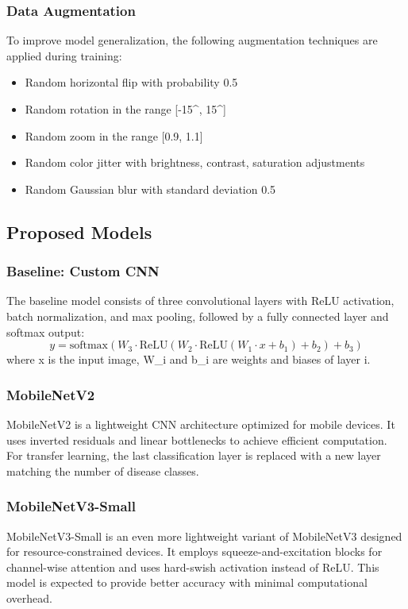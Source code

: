 \documentclass[conference]{IEEEtran}
\begin{document}
\subsubsection{Data Augmentation}
To improve model generalization, the following augmentation techniques are applied during training:
\begin{itemize}
\item Random horizontal flip with probability 0.5
\item Random rotation in the range [-15^\circ, 15^\circ]
\item Random zoom in the range [0.9, 1.1]
\item Random color jitter with brightness, contrast, saturation adjustments
\item Random Gaussian blur with standard deviation 0.5
\end{itemize}

\subsection{Proposed Models}
\subsubsection{Baseline: Custom CNN}
The baseline model consists of three convolutional layers with ReLU activation, batch normalization, and max pooling, followed by a fully connected layer and softmax output:
\begin{equation}
y = \text{softmax}(W_3 \cdot \text{ReLU}(W_2 \cdot \text{ReLU}(W_1 \cdot x + b_1) + b_2) + b_3)
\end{equation}
where x is the input image, W_i and b_i are weights and biases of layer i.

\subsubsection{MobileNetV2}
MobileNetV2 \cite{sandler2018} is a lightweight CNN architecture optimized for mobile devices. It uses inverted residuals and linear bottlenecks to achieve efficient computation. For transfer learning, the last classification layer is replaced with a new layer matching the number of disease classes.

\subsubsection{MobileNetV3-Small}
MobileNetV3-Small \cite{howard2019} is an even more lightweight variant of MobileNetV3 designed for resource-constrained devices. It employs squeeze-and-excitation blocks for channel-wise attention and uses hard-swish activation instead of ReLU. This model is expected to provide better accuracy with minimal computational overhead.
\end{document}
